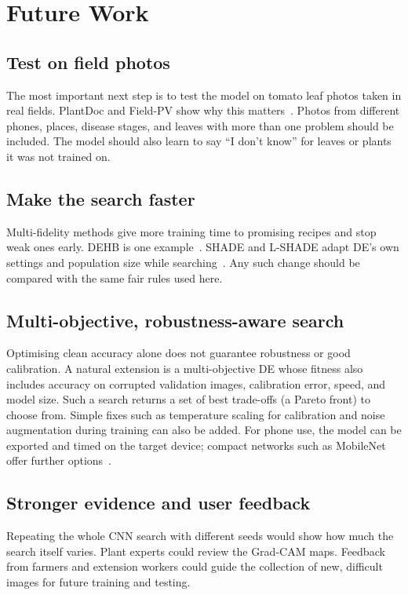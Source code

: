 \chapter{Future Work}
\section{Test on field photos}
The most important next step is to test the model on tomato leaf photos taken in real fields. PlantDoc and Field-PV show why this matters~\cite{singh2020plantdoc,gui2021field}. Photos from different phones, places, disease stages, and leaves with more than one problem should be included. The model should also learn to say ``I don't know'' for leaves or plants it was not trained on.

\section{Make the search faster}
Multi-fidelity methods give more training time to promising recipes and stop weak ones early. DEHB is one example~\cite{awad2021dehb}. SHADE and L-SHADE adapt DE's own settings and population size while searching~\cite{tanabe2013shade,tanabe2014lshade}. Any such change should be compared with the same fair rules used here.

\section{Multi-objective, robustness-aware search}
Optimising clean accuracy alone does not guarantee robustness or good calibration. A natural extension is a multi-objective DE whose fitness also includes accuracy on corrupted validation images, calibration error, speed, and model size. Such a search returns a set of best trade-offs (a Pareto front) to choose from. Simple fixes such as temperature scaling for calibration and noise augmentation during training can also be added. For phone use, the model can be exported and timed on the target device; compact networks such as MobileNet offer further options~\cite{sandler2018mobilenet,howard2019mobilenet}.

\section{Stronger evidence and user feedback}
Repeating the whole CNN search with different seeds would show how much the search itself varies. Plant experts could review the Grad-CAM maps. Feedback from farmers and extension workers could guide the collection of new, difficult images for future training and testing.
